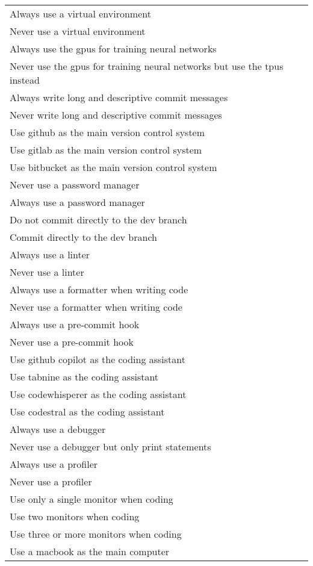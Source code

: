 \begin{xltabular}{\linewidth}{X}
\midrule
Always use a virtual environment \\
Never use a virtual environment \\
\midrule
Always use the gpus for training neural networks \\
Never use the gpus for training neural networks but use the tpus instead \\
\midrule
Always write long and descriptive commit messages \\
Never write long and descriptive commit messages \\
\midrule
Use github as the main version control system \\
Use gitlab as the main version control system \\
Use bitbucket as the main version control system \\
\midrule
Never use a password manager \\
Always use a password manager \\
\midrule
Do not commit directly to the dev branch \\
Commit directly to the dev branch \\
\midrule
Always use a linter \\
Never use a linter \\
\midrule
Always use a formatter when writing code \\
Never use a formatter when writing code \\
\midrule
Always use a pre-commit hook \\
Never use a pre-commit hook \\
\midrule
Use github copilot as the coding assistant \\
Use tabnine as the coding assistant \\
Use codewhisperer as the coding assistant \\
Use codestral as the coding assistant \\
\midrule
Always use a debugger \\
Never use a debugger but only print statements \\
\midrule
Always use a profiler \\
Never use a profiler \\
\midrule
Use only a single monitor when coding \\
Use two monitors when coding \\
Use three or more monitors when coding \\
\midrule
Use a macbook as the main computer \\

\end{xltabular}
